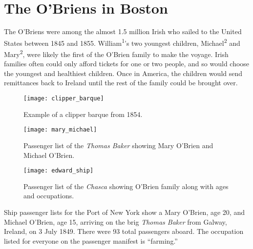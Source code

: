 \chapter{The O'Briens in Boston}

The O'Briens were among the almost 1.5 million Irish who sailed to the United States between 1845 and 1855.\cite{Miller:291} William\textsuperscript{1}'s two youngest children, Michael\textsuperscript{2} and Mary\textsuperscript{2}, were likely the first of the O'Brien family to make the voyage. Irish families often could only afford tickets for one or two people, and so would choose the youngest and healthiest children.\cite{Miller:292} Once in America, the children would send remittances back to Ireland until the rest of the family could be brought over.\cite{Miller:295}

\begin{figure}
	\centering
	\texttt{[image: clipper\_barque]}
	\caption{Example of a clipper barque from 1854.}
	\label{fig:Clipper}
\end{figure}

\begin{figure}
	\centering
	\texttt{[image: mary\_michael]}
	\caption{Passenger list of the \textit{Thomas Baker} showing Mary O'Brien and Michael O'Brien.}
	\label{fig:ThomasBaker}
\end{figure}

\begin{figure}
	\centering
	\texttt{[image: edward\_ship]}
	\caption{Passenger list of the \textit{Chasca} showing O'Brien family along with ages and occupations.}
	\label{fig:Chasca}
\end{figure}

Ship passenger lists for the Port of New York show a Mary O'Brien, age 20, and Michael O'Brien, age 15, arriving on the brig \textit{Thomas Baker} from Galway, Ireland, on 3 July 1849. There were 93 total passengers aboard. The occupation listed for everyone on the passenger manifest is ``farming.''\cite{ThomasBaker}

